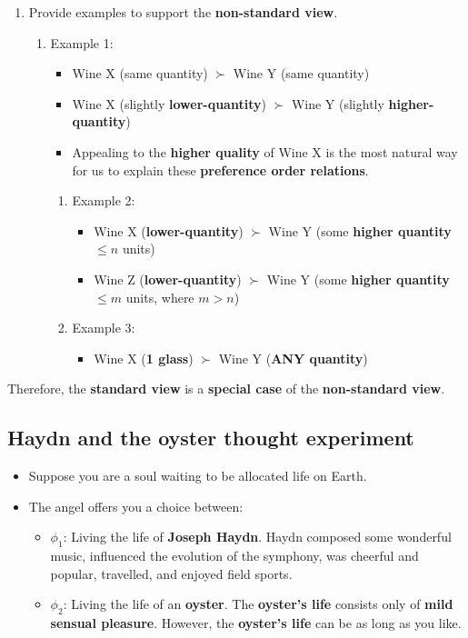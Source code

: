 \documentclass[11pt]{article}
\begin{document}
\begin{enumerate}
\item Provide examples to support the \textbf{non-standard view}.
\begin{enumerate}
\item Example 1:
\begin{itemize}
\item Wine X (same quantity) \(\succ\) Wine Y (same quantity)
\item Wine X (slightly \textbf{lower-quantity}) \(\succ\) Wine Y (slightly \textbf{higher-quantity})
\item Appealing to the \textbf{higher quality} of Wine X is the most natural way for us to explain these \textbf{preference order relations}.
\end{itemize}
\begin{enumerate}
\item Example 2:
\begin{itemize}
\item Wine X (\textbf{lower-quantity}) \(\succ\) Wine Y (some \textbf{higher quantity} \(\le n\) units)
\item Wine Z (\textbf{lower-quantity}) \(\succ\) Wine Y (some \textbf{higher quantity} \(\le m\) units, where \(m > n\))
\end{itemize}
\item Example 3:
\begin{itemize}
\item Wine X (\textbf{1 glass}) \(\succ\) Wine Y (\textbf{ANY quantity})
\end{itemize}
\end{enumerate}
\end{enumerate}
\end{enumerate}

Therefore, the \textbf{standard view} is a \textbf{special case} of the \textbf{non-standard view}.

 \newpage
\subsection{Haydn and the oyster thought experiment}
\label{sec:org7493eaf}
\begin{itemize}
\item Suppose you are a soul waiting to be allocated life on Earth.
\item The angel offers you a choice between:
\begin{itemize}
\item \(\phi_1\): Living the life of \textbf{Joseph Haydn}. Haydn composed some wonderful music, influenced the evolution of the symphony, was cheerful and popular, travelled, and enjoyed field sports.
\item \(\phi_2\): Living the life of an \textbf{oyster}. The \textbf{oyster's life} consists only of \textbf{mild sensual pleasure}. However, the \textbf{oyster's life} can be as long as you like.
\end{itemize}
\end{itemize}
\end{document}
